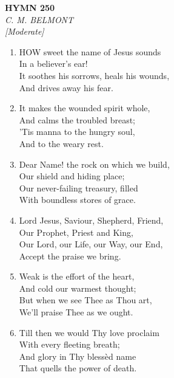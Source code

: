 \newpage
\begin{center}
    {\Large \textbf{HYMN 250}}
    \\
    \textit{C. M. BELMONT}
    \\
    \textit{\small [Moderate]}
\end{center}
\vspace{1em}

\begin{enumerate}
    \item HOW sweet the name of Jesus sounds \\
            In a believer's ear! \\
        It soothes his sorrows, heals his wounds, \\
            And drives away his fear.

    \item It makes the wounded spirit whole, \\
            And calms the troubled breast; \\
        'Tis manna to the hungry soul, \\
            And to the weary rest.

    \item Dear Name! the rock on which we build, \\
            Our shield and hiding place; \\
        Our never-failing treasury, filled \\
            With boundless stores of grace.

    \item Lord Jesus, Saviour, Shepherd, Friend, \\
            Our Prophet, Priest and King, \\
        Our Lord, our Life, our Way, our End, \\
            Accept the praise we bring.

    \item Weak is the effort of the heart, \\
            And cold our warmest thought; \\
        But when we see Thee as Thou art, \\
            We'll praise Thee as we ought.

    \item Till then we would Thy love proclaim \\
            With every fleeting breath; \\
        And glory in Thy bless\`ed name \\
            That quells the power of death.

\end{enumerate}

